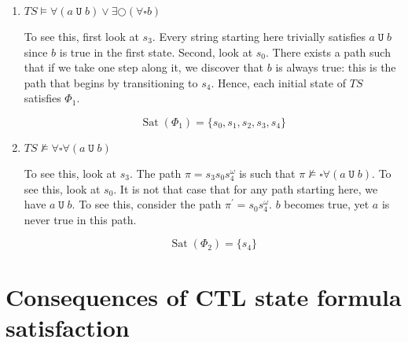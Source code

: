 \documentclass[letterpaper,11pt]{article}
\newcommand{\question}{\section}
\newcommand{\always}{\square}
\newcommand{\nmodels}{\nvDash}
\newcommand{\step}{\bigcirc}
\DeclareMathOperator{\untilOp}{\mathtt{U}}
\newcommand{\until}{\untilOp{}}
\newcommand{\parens}[1]{\left(#1\right)}
\DeclareMathOperator{\Sat}{Sat}
\newcommand{\sat}[1]{\Sat{\parens{#1}}}
\begin{document}
\begin{enumerate}
    \item $TS \models \forall (a \until b) \lor \exists \step (\forall \always b)$

        To see this, first look at $s_3$. Every string starting here trivially
        satisfies $a \until b$ since $b$ is true in the first state.
        Second, look at $s_0$. There exists a path such that if we take one
        step along it, we discover that $b$ is always true: this is the path
        that begins by transitioning to $s_4$. Hence, each initial state of
        $TS$ satisfies $\Phi_1$.

        \begin{equation*}
            \sat{\Phi_1} = \{ s_0, s_1, s_2, s_3, s_4 \}
        \end{equation*}

    \item $TS \nmodels \forall \always \forall (a \until b)$

        To see this, look at $s_3$. The path $\pi = s_3 s_0 s_4^\omega$
        is such that $\pi \nmodels \always \forall (a \until b)$. To see this,
        look at $s_0$. It is not that case that for any path starting here, we
        have $a \until b$. To see this, consider the path
        $\pi^\prime = s_0 s_4^\omega$. $b$ becomes true, yet $a$ is never true
        in this path.

        \begin{equation*}
            \sat{\Phi_2} = \{ s_4 \}
        \end{equation*}
\end{enumerate}

\question{Consequences of CTL state formula satisfaction}
\end{document}
